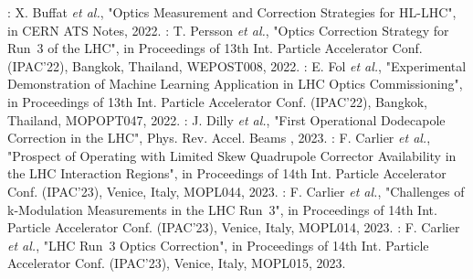 \begin{declaration}
\newline \newline
\noindent\cite{REPORT:OMC:Optics_Strategy_HLLHC}: X. Buffat \textit{et al.}, "Optics Measurement and Correction Strategies for HL-LHC", in CERN ATS Notes, \num{2022}. 
\newline \newline
\noindent\cite{IPAC:Persson:Optics_Correction_Strategy_2022}: T. Persson \textit{et al.}, "Optics Correction Strategy for Run~\num{3} of the LHC", in Proceedings of \num{13}th Int. Particle Accelerator Conf. (IPAC'22), Bangkok, Thailand, WEPOST008, \num{2022}.
\newline \newline
\noindent\cite{IPAC:Fol:ML_Application_LHC_Optics_Commissioning}: E. Fol \textit{et al.}, "Experimental Demonstration of Machine Learning Application in LHC Optics Commissioning", in Proceedings of \num{13}th Int. Particle Accelerator Conf. (IPAC'22), Bangkok, Thailand, MOPOPT047, \num{2022}.
\newline \newline
\noindent{}: J. Dilly \textit{et al.}, "First Operational Dodecapole Correction in the LHC", Phys. Rev. Accel. Beams , \num{2023}.
\newline \newline
\noindent{}: F. Carlier \textit{et al.}, "Prospect of Operating with Limited Skew Quadrupole Corrector Availability in the LHC Interaction Regions", in Proceedings of \num{14}th Int. Particle Accelerator Conf. (IPAC'23), Venice, Italy, MOPL044, \num{2023}.
\newline \newline
\noindent\cite{IPAC:Carlier:Challenges_kmodulation_LHC_Run3}: F. Carlier \textit{et al.}, "Challenges of k-Modulation Measurements in the LHC Run~3", in Proceedings of \num{14}th Int. Particle Accelerator Conf. (IPAC'23), Venice, Italy,  MOPL014, \num{2023}.
\newline \newline
\noindent\cite{IPAC:Carlier:LHC_Run3_Optics_Correction}: F. Carlier \textit{et al.}, "LHC Run~3 Optics Correction", in Proceedings of \num{14}th Int. Particle Accelerator Conf. (IPAC'23), Venice, Italy,  MOPL015, \num{2023}.
\newline \newline
{}
\end{declaration}

\cleardoublepage